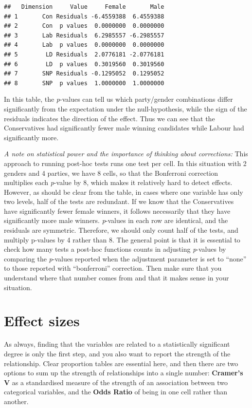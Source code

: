 \documentclass[
]{book}
\begin{document}
\begin{verbatim}
##   Dimension     Value     Female       Male
## 1       Con Residuals -6.4559388  6.4559388
## 2       Con  p values  0.0000000  0.0000000
## 3       Lab Residuals  6.2985557 -6.2985557
## 4       Lab  p values  0.0000000  0.0000000
## 5        LD Residuals  2.0776181 -2.0776181
## 6        LD  p values  0.3019560  0.3019560
## 7       SNP Residuals -0.1295052  0.1295052
## 8       SNP  p values  1.0000000  1.0000000
\end{verbatim}

In this table, the \emph{p}-values can tell us which party/gender combinations differ significantly from the expectation under the null-hypothesis, while the sign of the residuals indicates the direction of the effect. Thus we can see that the Conservatives had significantly fewer male winning candidates while Labour had significantly more.

\emph{A note on statistical power and the importance of thinking about corrections:} This approach to running post-hoc tests runs one test per cell. In this situation with 2 genders and 4 parties, we have 8 cells, so that the Bonferroni correction multiplies each \emph{p}-value by 8, which makes it relatively hard to detect effects. However, as should be clear from the table, in cases where one variable has only two levels, half of the tests are redundant. If we know that the Conservatives have significantly fewer female winners, it follows necessarily that they have significantly more male winners. \emph{p}-values in each row are identical, and the residuals are symmetric. Therefore, we should only count half of the tests, and multiply p-values by 4 rather than 8. The general point is that it is essential to check how many tests a post-hoc functions counts in adjusting \emph{p}-values by comparing the \emph{p}-values reported when the adjustment parameter is set to ``none'' to those reported with ``bonferroni'' correction. Then make sure that you understand where that number comes from and that it makes sense in your situation.

\hypertarget{effect-sizes}{%
\section{Effect sizes}\label{effect-sizes}}

As always, finding that the variables are related to a statistically significant degree is only the first step, and you also want to report the strength of the relationship. Clear proportion tables are essential here, and then there are two options to sum up the strength of relationships into a single number: \textbf{Cramer's V} as a standardised measure of the strength of an association between two categorical variables, and the \textbf{Odds Ratio} of being in one cell rather than another.
\end{document}
